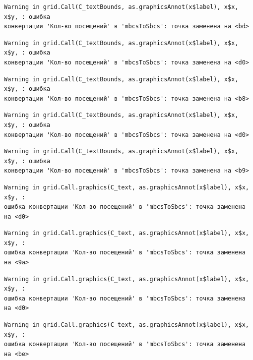 \documentclass[
  letterpaper,
  DIV=11,
  numbers=noendperiod]{scrreprt}
\begin{document}
\begin{verbatim}
Warning in grid.Call(C_textBounds, as.graphicsAnnot(x$label), x$x, x$y, : ошибка
конвертации 'Кол-во посещений' в 'mbcsToSbcs': точка заменена на <bd>
\end{verbatim}

\begin{verbatim}
Warning in grid.Call(C_textBounds, as.graphicsAnnot(x$label), x$x, x$y, : ошибка
конвертации 'Кол-во посещений' в 'mbcsToSbcs': точка заменена на <d0>
\end{verbatim}

\begin{verbatim}
Warning in grid.Call(C_textBounds, as.graphicsAnnot(x$label), x$x, x$y, : ошибка
конвертации 'Кол-во посещений' в 'mbcsToSbcs': точка заменена на <b8>
\end{verbatim}

\begin{verbatim}
Warning in grid.Call(C_textBounds, as.graphicsAnnot(x$label), x$x, x$y, : ошибка
конвертации 'Кол-во посещений' в 'mbcsToSbcs': точка заменена на <d0>
\end{verbatim}

\begin{verbatim}
Warning in grid.Call(C_textBounds, as.graphicsAnnot(x$label), x$x, x$y, : ошибка
конвертации 'Кол-во посещений' в 'mbcsToSbcs': точка заменена на <b9>
\end{verbatim}

\begin{verbatim}
Warning in grid.Call.graphics(C_text, as.graphicsAnnot(x$label), x$x, x$y, :
ошибка конвертации 'Кол-во посещений' в 'mbcsToSbcs': точка заменена на <d0>
\end{verbatim}

\begin{verbatim}
Warning in grid.Call.graphics(C_text, as.graphicsAnnot(x$label), x$x, x$y, :
ошибка конвертации 'Кол-во посещений' в 'mbcsToSbcs': точка заменена на <9a>
\end{verbatim}

\begin{verbatim}
Warning in grid.Call.graphics(C_text, as.graphicsAnnot(x$label), x$x, x$y, :
ошибка конвертации 'Кол-во посещений' в 'mbcsToSbcs': точка заменена на <d0>
\end{verbatim}

\begin{verbatim}
Warning in grid.Call.graphics(C_text, as.graphicsAnnot(x$label), x$x, x$y, :
ошибка конвертации 'Кол-во посещений' в 'mbcsToSbcs': точка заменена на <be>
\end{verbatim}
\end{document}

